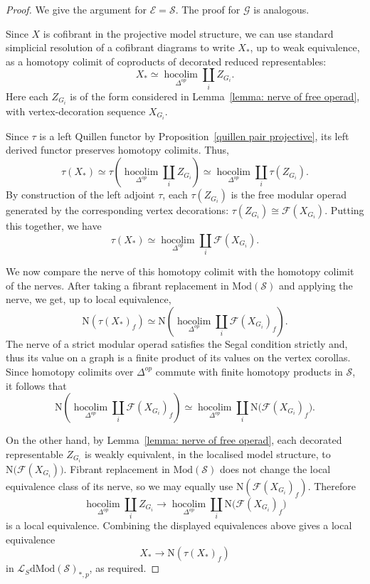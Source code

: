 \documentclass{amsart}
\newcommand{\bE}{\mathscr{E}}
\newcommand{\sSet}{\mathscr{S}}
\newcommand{\Grpd}{\mathscr{G}}
\newcommand{\Mod}{\mathrm{Mod}}
\newcommand{\dMod}{\mathrm{dMod}}
\newcommand{\nerve}{\mathrm{N}}
\theoremstyle{definition}
\numberwithin{equation}{section}
\begin{document}
\begin{proof}
We give the argument for $\bE=\sSet$. The proof for $\Grpd$ is analogous.

Since $X$ is cofibrant in the projective model structure, we can use standard simplicial resolution of a cofibrant diagrams to write $X_*$, up to weak equivalence, as a homotopy colimit of coproducts of decorated reduced representables:
\[
X_* \simeq \operatorname*{hocolim}_{\Delta^{op}}\coprod_i Z_{G_i}.
\]
Here each $Z_{G_i}$ is of the form considered in Lemma~\ref{lemma: nerve of free operad}, with vertex-decoration sequence $X_{G_i}$.

Since $\tau$ is a left Quillen functor by Proposition~\ref{quillen pair projective}, its left derived functor preserves homotopy colimits. Thus,
\[
\tau(X_*) \simeq \tau\left( \operatorname*{hocolim}_{\Delta^{op}}\coprod_i Z_{G_i} \right) \simeq \operatorname*{hocolim}_{\Delta^{op}}\coprod_i \tau(Z_{G_i}).
\]
By construction of the left adjoint $\tau$, each $\tau(Z_{G_i})$ is the free modular operad generated by the corresponding vertex decorations: $\tau(Z_{G_i})\cong \mathcal F(X_{G_i}).$ Putting this together, we have \[\tau(X_*) \simeq \operatorname*{hocolim}_{\Delta^{op}}\coprod_i \mathcal F(X_{G_i}).\]

We now compare the nerve of this homotopy colimit with the homotopy colimit of the nerves. After taking a fibrant replacement in $\Mod(\sSet)$ and applying
the nerve, we get, up to local equivalence,
\[
\nerve(\tau(X_*)_f) \simeq \nerve\left( \operatorname*{hocolim}_{\Delta^{op}}\coprod_i \mathcal F(X_{G_i})_{f} \right).
\] The nerve of a strict modular operad satisfies the Segal condition strictly and, thus its value on a graph is a finite product of its values on the vertex corollas. Since homotopy colimits over $\Delta^{op}$ commute with finite homotopy products in $\sSet$, it follows that
\[
\nerve\left(\operatorname*{hocolim}_{\Delta^{op}}\coprod_i \mathcal F(X_{G_i})_{f} \right) \simeq \operatorname*{hocolim}_{\Delta^{op}}\coprod_i \nerve\bigl(\mathcal F(X_{G_i})_{f}\bigr).
\]

On the other hand, by Lemma~\ref{lemma: nerve of free operad}, each decorated representable $Z_{G_i}$ is weakly equivalent, in the localised model structure, to $\nerve\bigl(\mathcal F(X_{G_i})\bigr).$ Fibrant replacement in $\Mod(\sSet)$ does not change the local equivalence class of its nerve, so we may equally use
$\nerve(\mathcal F(X_{G_i})_f)$. Therefore
\[
\operatorname*{hocolim}_{\Delta^{op}}\coprod_i Z_{G_i} \longrightarrow \operatorname*{hocolim}_{\Delta^{op}}\coprod_i \nerve\bigl(\mathcal F(X_{G_i})_{f}\bigr)
\]
is a local equivalence. Combining the displayed equivalences above gives a local equivalence
\[
X_* \longrightarrow \nerve(\tau(X_*)_f)
\]
in $\mathcal{L}_{S}\dMod(\sSet)_{*,p}$, as required.
\end{proof}
\end{document}
